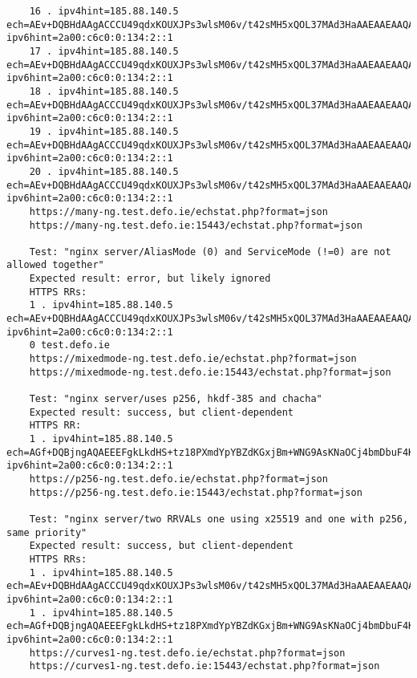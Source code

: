 \begin{verbatim}
    16 . ipv4hint=185.88.140.5 ech=AEv+DQBHdAAgACCCU49qdxKOUXJPs3wlsM06v/t42sMH5xQOL37MAd3HaAAEAAEAAQAYb3RoZXJwdWJsaWMudGVzdC5kZWZvLmllAAA= ipv6hint=2a00:c6c0:0:134:2::1
    17 . ipv4hint=185.88.140.5 ech=AEv+DQBHdAAgACCCU49qdxKOUXJPs3wlsM06v/t42sMH5xQOL37MAd3HaAAEAAEAAQAYb3RoZXJwdWJsaWMudGVzdC5kZWZvLmllAAA= ipv6hint=2a00:c6c0:0:134:2::1
    18 . ipv4hint=185.88.140.5 ech=AEv+DQBHdAAgACCCU49qdxKOUXJPs3wlsM06v/t42sMH5xQOL37MAd3HaAAEAAEAAQAYb3RoZXJwdWJsaWMudGVzdC5kZWZvLmllAAA= ipv6hint=2a00:c6c0:0:134:2::1
    19 . ipv4hint=185.88.140.5 ech=AEv+DQBHdAAgACCCU49qdxKOUXJPs3wlsM06v/t42sMH5xQOL37MAd3HaAAEAAEAAQAYb3RoZXJwdWJsaWMudGVzdC5kZWZvLmllAAA= ipv6hint=2a00:c6c0:0:134:2::1
    20 . ipv4hint=185.88.140.5 ech=AEv+DQBHdAAgACCCU49qdxKOUXJPs3wlsM06v/t42sMH5xQOL37MAd3HaAAEAAEAAQAYb3RoZXJwdWJsaWMudGVzdC5kZWZvLmllAAA= ipv6hint=2a00:c6c0:0:134:2::1
    https://many-ng.test.defo.ie/echstat.php?format=json
    https://many-ng.test.defo.ie:15443/echstat.php?format=json

    Test: "nginx server/AliasMode (0) and ServiceMode (!=0) are not allowed together"
    Expected result: error, but likely ignored
    HTTPS RRs:
    1 . ipv4hint=185.88.140.5 ech=AEv+DQBHdAAgACCCU49qdxKOUXJPs3wlsM06v/t42sMH5xQOL37MAd3HaAAEAAEAAQAYb3RoZXJwdWJsaWMudGVzdC5kZWZvLmllAAA= ipv6hint=2a00:c6c0:0:134:2::1
    0 test.defo.ie
    https://mixedmode-ng.test.defo.ie/echstat.php?format=json
    https://mixedmode-ng.test.defo.ie:15443/echstat.php?format=json

    Test: "nginx server/uses p256, hkdf-385 and chacha"
    Expected result: success, but client-dependent
    HTTPS RR:
    1 . ipv4hint=185.88.140.5 ech=AGf+DQBjngAQAEEEFgkLkdHS+tz18PXmdYpYBZdKGxjBm+WNG9AsKNaOCj4bmDbuF4KyvHEZGj6+Wls1VBe1OXierpjGiYOEriOWnAAEAAIAAwATcHVibGljLnRlc3QuZGVmby5pZQAA ipv6hint=2a00:c6c0:0:134:2::1
    https://p256-ng.test.defo.ie/echstat.php?format=json
    https://p256-ng.test.defo.ie:15443/echstat.php?format=json

    Test: "nginx server/two RRVALs one using x25519 and one with p256, same priority"
    Expected result: success, but client-dependent
    HTTPS RRs:
    1 . ipv4hint=185.88.140.5 ech=AEv+DQBHdAAgACCCU49qdxKOUXJPs3wlsM06v/t42sMH5xQOL37MAd3HaAAEAAEAAQAYb3RoZXJwdWJsaWMudGVzdC5kZWZvLmllAAA= ipv6hint=2a00:c6c0:0:134:2::1
    1 . ipv4hint=185.88.140.5 ech=AGf+DQBjngAQAEEEFgkLkdHS+tz18PXmdYpYBZdKGxjBm+WNG9AsKNaOCj4bmDbuF4KyvHEZGj6+Wls1VBe1OXierpjGiYOEriOWnAAEAAIAAwATcHVibGljLnRlc3QuZGVmby5pZQAA ipv6hint=2a00:c6c0:0:134:2::1
    https://curves1-ng.test.defo.ie/echstat.php?format=json
    https://curves1-ng.test.defo.ie:15443/echstat.php?format=json


\end{verbatim}
